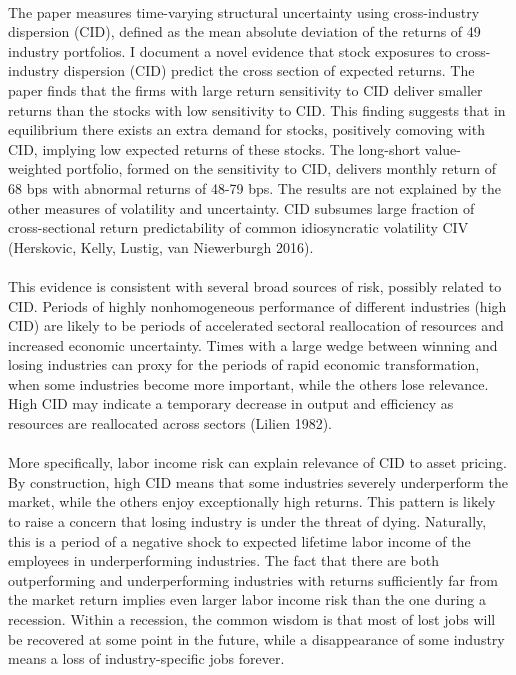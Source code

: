 \documentclass[12pt]{article}
\begin{document}
\paragraph{}
The paper measures time-varying structural uncertainty using cross-industry dispersion (CID), defined as the mean absolute deviation of the returns of 49 industry portfolios. I document a novel evidence that stock exposures to cross-industry dispersion (CID) predict the cross section of expected returns. The paper finds that the firms with large return sensitivity to CID deliver smaller returns than the stocks with low sensitivity to CID. This finding suggests that in equilibrium there exists an extra demand for stocks, positively comoving with CID, implying low expected returns of these stocks. The long-short value-weighted portfolio, formed on the sensitivity to CID, delivers monthly return of 68 bps with abnormal returns of 48-79 bps. The results are not explained by the other measures of volatility and uncertainty. CID subsumes large fraction of cross-sectional return predictability of common idiosyncratic volatility CIV (Herskovic, Kelly, Lustig, van Niewerburgh 2016). 
\paragraph{}
This evidence is consistent with several broad sources of risk, possibly related to CID. Periods of highly nonhomogeneous performance of different industries (high CID) are likely to be periods of accelerated sectoral reallocation of resources and increased economic uncertainty. Times with a large wedge between winning and losing industries can proxy for the periods of rapid economic transformation, when some industries become more important, while the others lose relevance. High CID may indicate a temporary decrease in output and efficiency as resources are reallocated across sectors (Lilien 1982). 
\paragraph{}
More specifically, labor income risk can explain relevance of CID to asset pricing. By construction, high CID means that some industries severely underperform the market, while the others enjoy exceptionally high returns. This pattern is likely to raise a concern that losing industry is under the threat of dying. Naturally, this is a period of a negative shock to expected lifetime labor income of the employees in underperforming industries. The fact that there are both outperforming and underperforming industries with returns sufficiently far from the market return implies even larger labor income risk than the one during a recession. Within a recession, the common wisdom is that most of lost jobs will be recovered at some point in the future, while a disappearance of some industry means a loss of industry-specific jobs forever. 
\end{document}
